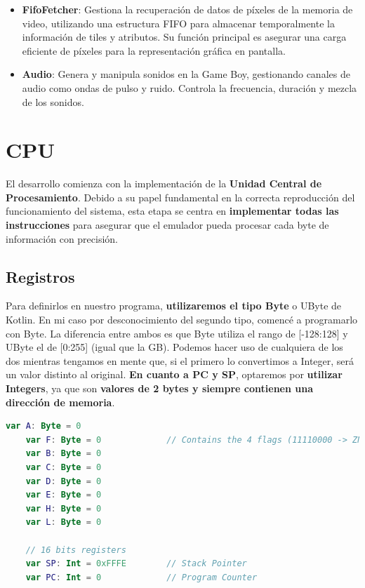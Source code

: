 \begin{itemize}
    \item \textbf{FifoFetcher}: Gestiona la recuperación de datos de píxeles de la memoria de video, utilizando una estructura FIFO para almacenar temporalmente la información de tiles y atributos. Su función principal es asegurar una carga eficiente de píxeles para la representación gráfica en pantalla.
    \item \textbf{Audio}: Genera y manipula sonidos en la Game Boy, gestionando canales de audio como ondas de pulso y ruido. Controla la frecuencia, duración y mezcla de los sonidos.
\end{itemize}

\section{CPU}

El desarrollo comienza con la implementación de la \textbf{Unidad Central de Procesamiento}. Debido a su papel fundamental en la correcta reproducción del funcionamiento del sistema, esta etapa se centra en \textbf{implementar todas las instrucciones} para asegurar que el emulador pueda procesar cada byte de información con precisión.

\subsection{Registros}
Para definirlos en nuestro programa, \textbf{utilizaremos el tipo Byte} o UByte de Kotlin. En mi caso por desconocimiento del segundo tipo, comencé a programarlo con Byte. La diferencia entre ambos es que Byte utiliza el rango de [-128:128] y UByte el de [0:255] (igual que la GB). Podemos hacer uso de cualquiera de los dos mientras tengamos en mente que, si el primero lo convertimos a Integer, será un valor distinto al original. \textbf{En cuanto a PC y SP}, optaremos por \textbf{utilizar Integers}, ya que son \textbf{valores de 2 bytes y siempre contienen una dirección de memoria}.
\clearpage
\begin{lstlisting}[language=Kotlin, caption={Declaración de Registros}, label={code:kotlinregistros}]
    var A: Byte = 0
    var F: Byte = 0             // Contains the 4 flags (11110000 -> ZNHC0000)
    var B: Byte = 0
    var C: Byte = 0
    var D: Byte = 0
    var E: Byte = 0
    var H: Byte = 0
    var L: Byte = 0

    // 16 bits registers
    var SP: Int = 0xFFFE        // Stack Pointer
    var PC: Int = 0             // Program Counter
\end{lstlisting}

